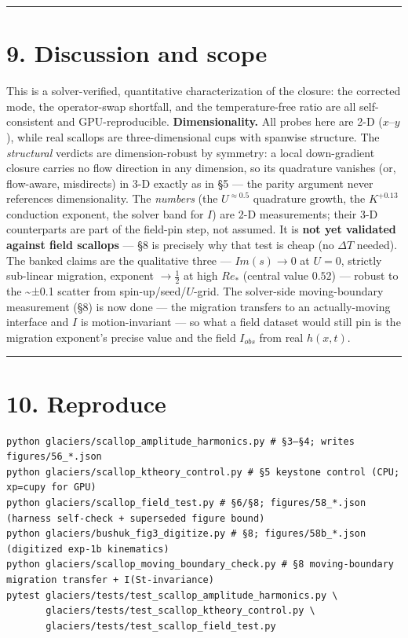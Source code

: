 \documentclass[11pt]{article}
\begin{document}
\medskip\hrule\medskip


\section*{9. Discussion and scope}


This is a solver-verified, quantitative characterization of the closure: the corrected mode, the operator-swap shortfall, and the temperature-free ratio are all self-consistent and GPU-reproducible. \textbf{Dimensionality.} All probes here are 2-D ($x$--$y$), while real scallops are three-dimensional cups with spanwise structure. The \emph{structural} verdicts are dimension-robust by symmetry: a local down-gradient closure carries no flow direction in any dimension, so its quadrature vanishes (or, flow-aware, misdirects) in 3-D exactly as in §5 --- the parity argument never references dimensionality. The \emph{numbers} (the $U^{\approx 0.5}$ quadrature growth, the $K^{+0.13}$ conduction exponent, the solver band for $I$) are 2-D measurements; their 3-D counterparts are part of the field-pin step, not assumed. It is \textbf{not yet validated against field scallops} — §8 is precisely why that test is cheap (no $\Delta T$ needed). The banked claims are the qualitative three — $Im(s)\to 0$ at $U=0$, strictly sub-linear migration, exponent $\to \tfrac{1}{2}$ at high $Re_*$ (central value $0.52$) — robust to the \textasciitilde{}±0.1 scatter from spin-up/seed/$U$-grid. The solver-side moving-boundary measurement (§8) is now done — the migration transfers to an actually-moving interface and $I$ is motion-invariant — so what a field dataset would still pin is the migration exponent's precise value and the field $I_{obs}$ from real $h(x,t)$.


\medskip\hrule\medskip


\section*{10. Reproduce}


\begin{Verbatim}
python glaciers/scallop_amplitude_harmonics.py # §3–§4; writes figures/56_*.json
python glaciers/scallop_ktheory_control.py # §5 keystone control (CPU; xp=cupy for GPU)
python glaciers/scallop_field_test.py # §6/§8; figures/58_*.json (harness self-check + superseded figure bound)
python glaciers/bushuk_fig3_digitize.py # §8; figures/58b_*.json (digitized exp-1b kinematics)
python glaciers/scallop_moving_boundary_check.py # §8 moving-boundary migration transfer + I(St-invariance)
pytest glaciers/tests/test_scallop_amplitude_harmonics.py \
       glaciers/tests/test_scallop_ktheory_control.py \
       glaciers/tests/test_scallop_field_test.py
\end{Verbatim}
\end{document}

